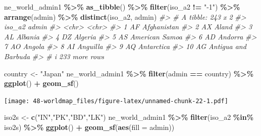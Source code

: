 \documentclass[
  xelatex, ja=standard]{bxjsbook}
\newenvironment{Shaded}{\begin{snugshade}}{\end{snugshade}}
\newcommand{\AttributeTok}[1]{\textcolor[rgb]{0.13,0.29,0.53}{#1}}
\newcommand{\CommentTok}[1]{\textcolor[rgb]{0.56,0.35,0.01}{\textit{#1}}}
\newcommand{\FunctionTok}[1]{\textcolor[rgb]{0.13,0.29,0.53}{\textbf{#1}}}
\newcommand{\NormalTok}[1]{#1}
\newcommand{\OtherTok}[1]{\textcolor[rgb]{0.56,0.35,0.01}{#1}}
\newcommand{\SpecialCharTok}[1]{\textcolor[rgb]{0.81,0.36,0.00}{\textbf{#1}}}
\newcommand{\StringTok}[1]{\textcolor[rgb]{0.31,0.60,0.02}{#1}}
\theoremstyle{definition}
\theoremstyle{definition}
\theoremstyle{definition}
\theoremstyle{definition}
\theoremstyle{remark}
\begin{document}
\begin{Shaded}
\begin{Highlighting}[]
\NormalTok{ne\_world\_admin1 }\SpecialCharTok{\%\textgreater{}\%} \FunctionTok{as\_tibble}\NormalTok{() }\SpecialCharTok{\%\textgreater{}\%} 
  \FunctionTok{filter}\NormalTok{(iso\_a2 }\SpecialCharTok{!=} \StringTok{"{-}1"}\NormalTok{) }\SpecialCharTok{\%\textgreater{}\%} \FunctionTok{arrange}\NormalTok{(admin) }\SpecialCharTok{\%\textgreater{}\%}
  \FunctionTok{distinct}\NormalTok{(iso\_a2, admin)}
\CommentTok{\#\textgreater{} \# A tibble: 243 x 2}
\CommentTok{\#\textgreater{}    iso\_a2 admin              }
\CommentTok{\#\textgreater{}    \textless{}chr\textgreater{}  \textless{}chr\textgreater{}              }
\CommentTok{\#\textgreater{}  1 AF     Afghanistan        }
\CommentTok{\#\textgreater{}  2 AX     Aland              }
\CommentTok{\#\textgreater{}  3 AL     Albania            }
\CommentTok{\#\textgreater{}  4 DZ     Algeria            }
\CommentTok{\#\textgreater{}  5 AS     American Samoa     }
\CommentTok{\#\textgreater{}  6 AD     Andorra            }
\CommentTok{\#\textgreater{}  7 AO     Angola             }
\CommentTok{\#\textgreater{}  8 AI     Anguilla           }
\CommentTok{\#\textgreater{}  9 AQ     Antarctica         }
\CommentTok{\#\textgreater{} 10 AG     Antigua and Barbuda}
\CommentTok{\#\textgreater{} \# i 233 more rows}
\end{Highlighting}
\end{Shaded}

\begin{Shaded}
\begin{Highlighting}[]
\NormalTok{country }\OtherTok{\textless{}{-}} \StringTok{"Japan"}
\NormalTok{ne\_world\_admin1 }\SpecialCharTok{\%\textgreater{}\%} \FunctionTok{filter}\NormalTok{(admin }\SpecialCharTok{==}\NormalTok{ country) }\SpecialCharTok{\%\textgreater{}\%} 
  \FunctionTok{ggplot}\NormalTok{() }\SpecialCharTok{+} \FunctionTok{geom\_sf}\NormalTok{()}
\end{Highlighting}
\end{Shaded}

\texttt{[image: 48-worldmap\_files/figure-latex/unnamed-chunk-22-1.pdf]}

\begin{Shaded}
\begin{Highlighting}[]
\NormalTok{iso2s }\OtherTok{\textless{}{-}} \FunctionTok{c}\NormalTok{(}\StringTok{"IN"}\NormalTok{,}\StringTok{"PK"}\NormalTok{,}\StringTok{"BD"}\NormalTok{,}\StringTok{"LK"}\NormalTok{)}
\NormalTok{ne\_world\_admin1 }\SpecialCharTok{\%\textgreater{}\%} \FunctionTok{filter}\NormalTok{(iso\_a2 }\SpecialCharTok{\%in\%}\NormalTok{ iso2s) }\SpecialCharTok{\%\textgreater{}\%} 
  \FunctionTok{ggplot}\NormalTok{() }\SpecialCharTok{+}   \FunctionTok{geom\_sf}\NormalTok{(}\FunctionTok{aes}\NormalTok{(}\AttributeTok{fill =}\NormalTok{ admin))}
\end{Highlighting}
\end{Shaded}
\end{document}
